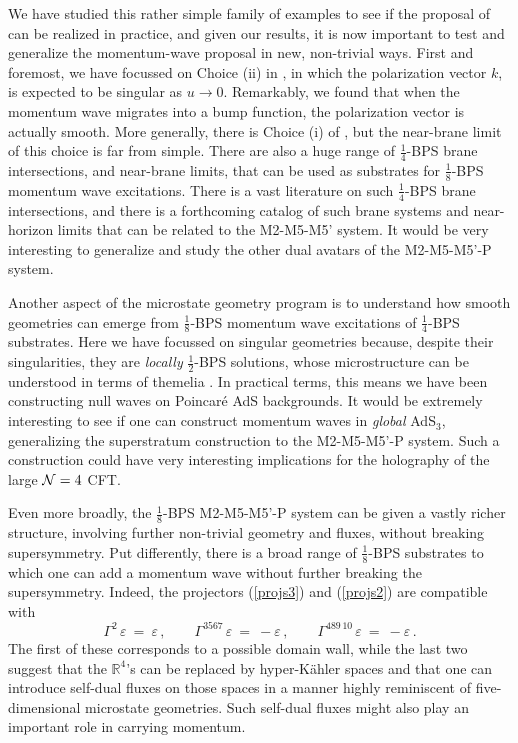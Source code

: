 \documentclass[11pt]{article}
\def\IR{\mathbb{R}}
\def\cN{{\cal N}}
\def\nBPS#1{$\frac{1}{#1}$-BPS}
\numberwithin{equation}{section}
\begin{document}
We have studied this rather simple family of examples to see if the proposal of \cite{Bena:2024qed} can be  realized  in practice, and given our results, it is now important to test and generalize the momentum-wave proposal in new, non-trivial ways.  First and foremost, we have focussed on Choice (ii)  in \cite{Bena:2024qed}, in which the polarization vector $k$, is expected to be singular as $u \to 0$. Remarkably, we found that when the momentum wave migrates into a bump function, the polarization vector is actually smooth.  More generally, there is Choice (i) of \cite{Bena:2024qed}, but the near-brane limit of this choice is far from simple.  There are also a huge range of \nBPS{4}  brane intersections, and  near-brane limits, that can be used as substrates for \nBPS{8} momentum wave excitations.  There is a vast literature on such \nBPS{4}  brane intersections, and there is a forthcoming catalog \cite{BDTW} of such brane systems and near-horizon limits that can be related to the M2-M5-M5' system. It would be very interesting to generalize and study the other dual avatars of the M2-M5-M5'-P system.

Another aspect of the microstate geometry program is to understand how smooth geometries can emerge from \nBPS{8} momentum wave excitations of \nBPS{4}  substrates.  Here we have focussed on singular geometries because, despite their singularities, they are {\it locally} \nBPS{2} solutions, whose microstructure can be understood in terms of themelia \cite{Bena:2022fzf, Bena:2024qed}.  In practical terms, this means we have been constructing null waves on Poincar\'e AdS backgrounds.  It would be extremely interesting to see if one can construct momentum waves in {\it global} AdS$_3$, generalizing the superstratum construction to the M2-M5-M5'-P system.  Such a construction could have very interesting implications for the holography of the large $\cN=4$ CFT.  

Even more broadly, the \nBPS{8} M2-M5-M5'-P system  can be given a vastly richer structure,  involving further non-trivial geometry and fluxes,  without breaking supersymmetry.  Put differently, there is a broad range of \nBPS{8} substrates to which one can add a momentum wave without further breaking the supersymmetry.  Indeed, the projectors (\ref{projs3}) and  (\ref{projs2})  are compatible with 
%
\begin{equation}
 \Gamma^{2} \, \varepsilon  ~=~  \varepsilon \,,   \qquad  \Gamma^{3567} \, \varepsilon  ~=~- \varepsilon \,,\qquad \Gamma^{489\,10} \, \varepsilon  ~=~-  \varepsilon \,.
 \label{projs4}
\end{equation}
%
The first of these corresponds to a possible domain wall, while the last two suggest that the $\IR^4$'s can be replaced by hyper-K\"ahler spaces and that one can introduce self-dual fluxes on those spaces in a manner highly reminiscent of five-dimensional microstate geometries.  Such self-dual fluxes might also play an important role in carrying momentum.
\end{document}
